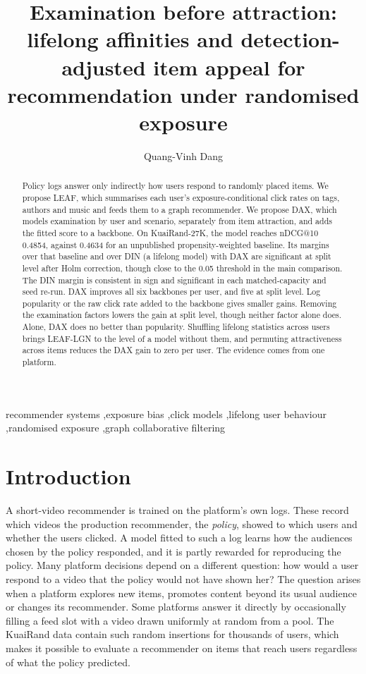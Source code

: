 \documentclass[preprint,12pt,authoryear]{elsarticle}
\begin{document}
\begin{frontmatter}
\title{Examination before attraction: lifelong affinities and detection-adjusted item appeal for recommendation under randomised exposure}
\author[buv]{Quang-Vinh Dang}
\begin{abstract}
Policy logs answer only indirectly how users respond to randomly placed items. We propose LEAF, which summarises each user's exposure-conditional click rates on tags, authors and music and feeds them to a graph recommender. We propose DAX, which models examination by user and scenario, separately from item attraction, and adds the fitted score to a backbone. On KuaiRand-27K, the model reaches nDCG@10 0.4854, against 0.4634 for an unpublished propensity-weighted baseline. Its margins over that baseline and over DIN (a lifelong model) with DAX are significant at split level after Holm correction, though close to the 0.05 threshold in the main comparison. The DIN margin is consistent in sign and significant in each matched-capacity and seed re-run. DAX improves all six backbones per user, and five at split level. Log popularity or the raw click rate added to the backbone gives smaller gains. Removing the examination factors lowers the gain at split level, though neither factor alone does. Alone, DAX does no better than popularity. Shuffling lifelong statistics across users brings LEAF-LGN to the level of a model without them, and permuting attractiveness across items reduces the DAX gain to zero per user. The evidence comes from one platform.

\end{abstract}
\begin{keyword}
recommender systems \sep exposure bias \sep click models \sep lifelong user behaviour \sep randomised exposure \sep graph collaborative filtering
\end{keyword}
\end{frontmatter}
\section{Introduction}
\label{sec:intro}

A short-video recommender is trained on the platform's own logs. These record which videos the production recommender, the
\emph{policy}, showed to which users and whether the users clicked. A model fitted to such a log learns how the audiences chosen
by the policy responded, and it is partly rewarded for reproducing the policy. Many platform decisions depend on a different
question: how would a user respond to a video that the policy would not have shown her? The question arises when a platform
explores new items, promotes content beyond its usual audience or changes its recommender. Some platforms answer it directly by
occasionally filling a feed slot with a video drawn uniformly at random from a pool. The KuaiRand data \citep{gao2022kuairand}
contain such random insertions for thousands of users, which makes it possible to evaluate a recommender on items that reach
users regardless of what the policy predicted.
\end{document}
